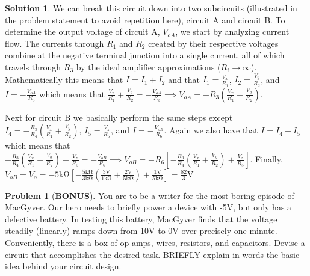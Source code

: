 \documentclass[10pt]{article}
\theoremstyle{definition}
\newtheorem{problem}{Problem}
\newtheorem{soln}{Solution}
\begin{document}
\begin{soln} 
  We can break this circuit down into two subcircuits (illustrated in the problem statement to avoid repetition here), circuit A and circuit B. To determine
  the output voltage of circuit A, $V_{oA}$, we start by analyzing current flow. The currents through $R_1$ and $R_2$ created by their respective voltages
  combine at the negative terminal junction into a single current, all of which travels through $R_3$ by the ideal amplifier approximations ($R_i\to\infty$).
  Mathematically this means that $I=I_1+I_2$ and that $I_1=\displaystyle\frac{V_x}{R_1}$, $I_2=\displaystyle\frac{V_y}{R_2}$, and $I=-\displaystyle\frac{V_{oA}}{R_3}$
  which means that $\displaystyle\frac{V_x}{R_1}+\frac{V_y}{R_2}=-\frac{V_{oA}}{R_3}\implies V_{oA}=-R_3\left(\frac{V_x}{R_1}+\frac{V_y}{R_2}\right)$.
  
  \noindent Next for circuit B we basically perform the same steps except $I_4=-\displaystyle\frac{R_3}{R_4}\left(\frac{V_x}{R_1}+\frac{V_y}{R_2}\right)$, $I_5=\displaystyle\frac{V_z}{R_5}$, and $I=-\displaystyle\frac{V_{oB}}{R_6}$.
  Again we also have that $I=I_4+I_5$ which means that $\displaystyle-\frac{R_3}{R_4}\left(\frac{V_x}{R_1}+\frac{V_y}{R_2}\right)+\frac{V_z}{R_5}=-\displaystyle\frac{V_{oB}}{R_6}
    \implies V_{oB}=-R_6\left[-\frac{R_3}{R_4}\left(\frac{V_x}{R_1}+\frac{V_y}{R_2}\right)+\frac{V_z}{R_5}\right]$. Finally, $V_{oB}=
    \displaystyle V_o=-5\unit{\kilo\ohm}\left[-\frac{5\unit{\kilo\ohm}}{3\unit{\kilo\ohm}}\left(\frac{3\unit{\volt}}{1\unit{\kilo\ohm}}+\frac{2\unit{\volt}}{5\unit{\kilo\ohm}}\right)+\frac{1\unit{\volt}}{5\unit{\kilo\ohm}}\right]
    =\frac{82}{3}\unit{\volt}$
\end{soln}
\begin{problem}[\textbf{BONUS}]
You are to be a writer for the most boring episode of MacGyver. Our hero needs to
briefly power a device with -5V, but only has a defective battery. In testing this battery, MacGyver
finds that the voltage steadily (linearly) ramps down from 10V to 0V over precisely one minute.
Conveniently, there is a box of op-amps, wires, resistors, and capacitors. Devise a circuit that
accomplishes the desired task. BRIEFLY explain in words the basic idea behind your circuit
design.
\end{problem}
\end{document}

